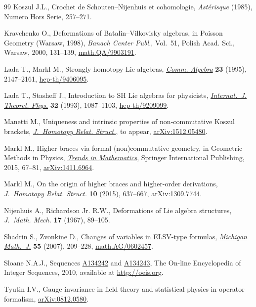 \documentclass[pdftex]{sigma}
\numberwithin{equation}{section}
\begin{document}
\begin{thebibliography}{99}
Koszul J.L., Crochet de {S}chouten--{N}ijenhuis et cohomologie,
 \textit{Ast\'erisque} (1985), {N}umero Hors Serie, 257--271.

Kravchenko O., Deformations of {B}atalin--{V}ilkovisky algebras, in Poisson
 {G}eometry ({W}arsaw, 1998), \textit{Banach Center Publ.}, Vol.~51, Polish
 Acad. Sci., Warsaw, 2000, 131--139, \href{http://arxiv.org/abs/math.QA/9903191}{math.QA/9903191}.

Lada T., Markl M., Strongly homotopy {L}ie algebras, \href{http://dx.doi.org/10.1080/00927879508825335}{\textit{Comm. Algebra}}
 \textbf{23} (1995), 2147--2161, \href{http://arxiv.org/abs/hep-th/9406095}{hep-th/9406095}.

Lada T., Stashef\/f J., Introduction to {SH} {L}ie algebras for physicists,
 \href{http://dx.doi.org/10.1007/BF00671791}{\textit{Internat.~J. Theoret. Phys.}} \textbf{32} (1993), 1087--1103,
 \href{http://arxiv.org/abs/hep-th/9209099}{hep-th/9209099}.

Manetti M., Uniqueness and intrinsic properties of non-commutative {K}oszul
 brackets, \href{http://dx.doi.org/10.1007/s40062-016-0136-0}{\textit{J.~Homotopy Relat. Struct.}}, {t}o appear,
 \href{http://arxiv.org/abs/1512.05480}{arXiv:1512.05480}.

Markl M., Higher braces via formal (non)commutative geometry, in Geometric
 {M}ethods in {P}hysics, \href{http://dx.doi.org/10.1007/978-3-319-18212-4_4}{\textit{Trends in Mathematics}}, Springer International
 Publishing, 2015, 67--81, \href{http://arxiv.org/abs/1411.6964}{arXiv:1411.6964}.

Markl M., On the origin of higher braces and higher-order derivations,
 \href{http://dx.doi.org/10.1007/s40062-014-0079-2}{\textit{J.~Homotopy Relat. Struct.}} \textbf{10} (2015), 637--667,
 \href{http://arxiv.org/abs/1309.7744}{arXiv:1309.7744}.

Nijenhuis A., Richardson Jr. R.W., Deformations of {L}ie algebra structures,
 \textit{J.~Math. Mech.} \textbf{17} (1967), 89--105.

Shadrin S., Zvonkine D., Changes of variables in {ELSV}-type formulas,
 \href{http://dx.doi.org/10.1307/mmj/1177681994}{\textit{Michigan Math.~J.}} \textbf{55} (2007), 209--228,
 \href{http://arxiv.org/abs/math.AG/0602457}{math.AG/0602457}.

Sloane N.A.J., Sequences \href{http://oeis.org/A134242}{A134242} and
 \href{http://oeis.org/A134243}{A134243}, {T}he On-line Encyclopedia of
 Integer Sequences, 2010, available at \url{http://oeis.org}.

Tyutin I.V., Gauge invariance in f\/ield theory and statistical physics in
 operator formalism, \href{http://arxiv.org/abs/0812.0580}{arXiv:0812.0580}.

\end{thebibliography}\LastPageEnding
\end{document}
